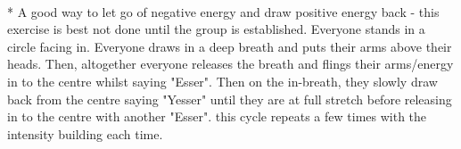 \begin{minipage}{\textwidth}
\\*
A good way to let go of negative energy and draw positive energy back - this exercise is best not done until the group is established. Everyone stands in a circle facing in. Everyone draws in a deep breath and puts their arms above their heads. Then, altogether everyone releases the breath and flings their arms/energy in to the centre whilst saying "Esser". Then on the in-breath, they slowly draw back from the centre saying "Yesser" until they are at full stretch before releasing in to the centre with another "Esser".  this cycle repeats a few times with the intensity building each time.
\end{minipage}    \vfill
